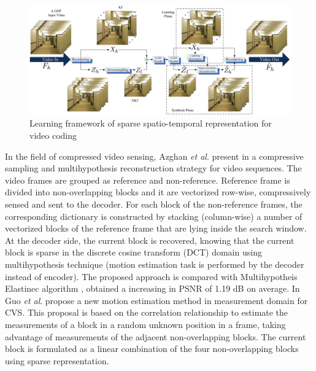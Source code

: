 \begin{figure}[!h]
\centering
\includegraphics[width=\textwidth]{images/spatio-temporal.eps}
\caption[Learning framework of sparse spatio-temporal representation for video coding]{Learning framework of sparse spatio-temporal representation for video coding \cite{sparse_st}}
\label{fig:spatio-temporal}
\end{figure} 

In the field of compressed video sensing, Azghan \emph{et al}. present in \cite{7076640} a compressive sampling and  multihypothesis reconstruction strategy for video sequences. The video frames are grouped as reference and non-reference. Reference frame is divided into non-overlapping blocks and it are vectorized row-wise, compressively sensed and sent to the  decoder. For each block of the non-reference frames, the corresponding dictionary  is  constructed  by  stacking  (column-wise)  a number  of  vectorized  blocks  of  the  reference frame that are lying inside the search window. At the decoder side, the current block is recovered,  knowing that the current block is sparse in the discrete cosine  transform (DCT) domain using multihypothesis technique (motion estimation task is performed by the decoder instead of encoder). The proposed approach is compared with Multihypotheis Elastinec algorithm \cite{Chen:2015}, obtained  a increasing in PSNR of 1.19 dB on average. In \cite{6984694}  Guo \emph{et al}. propose a new motion estimation method in measurement domain for CVS. This proposal is based on the correlation relationship to  
estimate the measurements of a block in a random unknown position in a frame, taking advantage of measurements of the adjacent non-overlapping blocks. The current block is formulated as a linear combination  of the four non-overlapping blocks using sparse representation. \\
 
